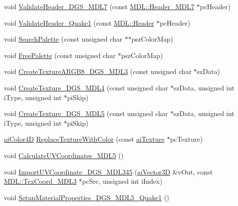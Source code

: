 \begin{DoxyCompactItemize}
\item 
void \hyperlink{class_assimp_1_1_m_d_l_importer_a9e9ce1d177c90bbd95aa5c2a3e77ea77}{Validate\+Header\+\_\+D\+G\+S\+\_\+\+M\+D\+L7} (const \hyperlink{struct_assimp_1_1_m_d_l_1_1_header___m_d_l7}{M\+D\+L\+::\+Header\+\_\+\+M\+D\+L7} $\ast$pc\+Header)
\item 
void \hyperlink{class_assimp_1_1_m_d_l_importer_a1bbf32ec8ccba826b752f946dad2af5d}{Validate\+Header\+\_\+\+Quake1} (const \hyperlink{struct_assimp_1_1_m_d_l_1_1_header}{M\+D\+L\+::\+Header} $\ast$pc\+Header)
\item 
void \hyperlink{class_assimp_1_1_m_d_l_importer_af8088e0602fc58ad5d93e0d7ea7ed45c}{Search\+Palette} (const unsigned char $\ast$$\ast$psz\+Color\+Map)
\item 
void \hyperlink{class_assimp_1_1_m_d_l_importer_ad89156b5a500b4644777f4e1fcc57ed5}{Free\+Palette} (const unsigned char $\ast$psz\+Color\+Map)
\item 
void \hyperlink{class_assimp_1_1_m_d_l_importer_a32f9149f4377db833e7ab20a298b5c68}{Create\+Texture\+A\+R\+G\+B8\+\_\+D\+G\+S\+\_\+\+M\+D\+L3} (const unsigned char $\ast$sz\+Data)
\item 
void \hyperlink{class_assimp_1_1_m_d_l_importer_a71308616f6db2964badc31e080ad2e86}{Create\+Texture\+\_\+D\+G\+S\+\_\+\+M\+D\+L4} (const unsigned char $\ast$sz\+Data, unsigned int i\+Type, unsigned int $\ast$pi\+Skip)
\item 
void \hyperlink{class_assimp_1_1_m_d_l_importer_a195711d7628a49b0a884dd2c02cc6c04}{Create\+Texture\+\_\+D\+G\+S\+\_\+\+M\+D\+L5} (const unsigned char $\ast$sz\+Data, unsigned int i\+Type, unsigned int $\ast$pi\+Skip)
\item 
\hyperlink{structai_color4_d}{ai\+Color4\+D} \hyperlink{class_assimp_1_1_m_d_l_importer_af2a06afd91b03e01ecb8131e111bfc44}{Replace\+Texture\+With\+Color} (const \hyperlink{structai_texture}{ai\+Texture} $\ast$pc\+Texture)
\item 
void \hyperlink{class_assimp_1_1_m_d_l_importer_a66c4c6fbbcb16fb75f3296fe1f8ae078}{Calculate\+U\+V\+Coordinates\+\_\+\+M\+D\+L5} ()
\item 
void \hyperlink{class_assimp_1_1_m_d_l_importer_a3a7ff38627af31051decd3256dee290b}{Import\+U\+V\+Coordinate\+\_\+D\+G\+S\+\_\+\+M\+D\+L345} (\hyperlink{structai_vector3_d}{ai\+Vector3\+D} \&v\+Out, const \hyperlink{struct_assimp_1_1_m_d_l_1_1_tex_coord___m_d_l3}{M\+D\+L\+::\+Tex\+Coord\+\_\+\+M\+D\+L3} $\ast$pc\+Src, unsigned int i\+Index)
\item 
void \hyperlink{class_assimp_1_1_m_d_l_importer_aa5a73aacb5640857d879d43f63ab47c5}{Setup\+Material\+Properties\+\_\+D\+G\+S\+\_\+\+M\+D\+L5\+\_\+\+Quake1} ()
$$
\end{DoxyCompactItemize}
